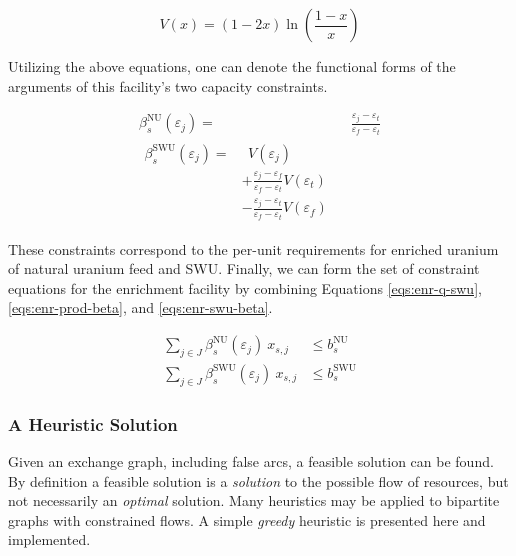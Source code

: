 \begin{equation}\label{eqs:value}
  V(x) = (1-2x) \ln \left(\frac{1-x}{x}\right)
\end{equation}

Utilizing the above equations, one can denote the functional forms of the
arguments of this facility's two capacity constraints.

\begin{align}
\label{eqs:enr-prod-beta}
\beta_{s}^{\text{NU}}(\varepsilon_{j}) = & \:\: \frac{\varepsilon_{j} - \varepsilon_{t}}
                                      {\varepsilon_{f} - \varepsilon_{t}} \\
\begin{split}
\label{eqs:enr-swu-beta}
\beta_{s}^{\text{SWU}}(\varepsilon_{j}) = & \:\: V(\varepsilon_{j}) \\
                         & + \frac{\varepsilon_{j} - \varepsilon_{f}}
                                  {\varepsilon_{f} - \varepsilon_{t}} V(\varepsilon_{t}) \\
                         & - \frac{\varepsilon_{j} - \varepsilon_{t}}
                                  {\varepsilon_{f} - \varepsilon_{t}} V(\varepsilon_{f})
\end{split}
\end{align}

These constraints correspond to the per-unit requirements for enriched uranium
of natural uranium feed and SWU. Finally, we can form the set of constraint
equations for the enrichment facility by combining Equations
\ref{eqs:enr-q-swu}, \ref{eqs:enr-prod-beta}, and \ref{eqs:enr-swu-beta}.

\begin{align}
\label{eqs:enr-prod-constr}
\sum_{j \in J}\beta_{s}^{\text{NU}}(\varepsilon_{j}) \: x_{s,j}  & \leq b_{s}^{\text{NU}} \\
\label{eqs:enr-swu-constr}
\sum_{j \in J}\beta_{s}^{\text{SWU}}(\varepsilon_{j}) \: x_{s,j} & \leq b_{s}^{\text{SWU}}
\end{align}

\subsubsection{A Heuristic Solution}\label{abm:dre:nfctp:heur}

Given an exchange graph, including false arcs, a feasible solution can be
found. By definition a feasible solution is a \textit{solution} to the possible
flow of resources, but not necessarily an \textit{optimal} solution. Many
heuristics may be applied to bipartite graphs with constrained flows. A simple
\textit{greedy} heuristic is presented here and implemented.

